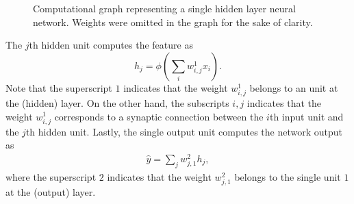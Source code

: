 \documentclass[letterpaper,10pt,english]{jupyterBook}
\let\sphinxpxdimen\pdfpxdimen\else\newdimen\sphinxpxdimen
\begin{document}
\begin{figure}
\centering
\noindent\sphinxincludegraphics[height=320\sphinxpxdimen]{{single_layer_MLP}.png}
\caption{Computational graph representing a single hidden layer neural network. Weights were omitted in the graph for the sake of clarity.}\label{\detokenize{neuralnets_architecture:computational-graph3}}\end{figure}

\sphinxAtStartPar
The \(j\)\sphinxhyphen{}th hidden unit computes the  feature as
\label{equation:neuralnets_architecture:e01fe95a-3f1f-4a02-88e0-b469822c510e}\begin{equation}
h_{j} = \phi \left( \sum_{i} w^{1}_{i,j} x_{i} \right). \nonumber
\end{equation}
\sphinxAtStartPar
Note that the superscript \( 1 \) indicates that the weight \( w^{1}_{i,j} \) belongs to an unit at the  (hidden) layer. On the other hand, the subscripts \( i,j \) indicates that the weight \( w^{1}_{i,j} \) corresponds to a synaptic connection between the \(i\)\sphinxhyphen{}th input unit and the \(j\)\sphinxhyphen{}th hidden unit. Lastly, the single output unit computes the network output as \begin{equation*}
\begin{split} \hat{y} = \sum_{j} w^{2}_{j,1} h_j, \end{split}
\end{equation*} where the superscript \( 2 \) indicates that the weight \( w^{2}_{j,1} \) belongs to the single unit \( 1 \) at the  (output) layer.
\end{document}
